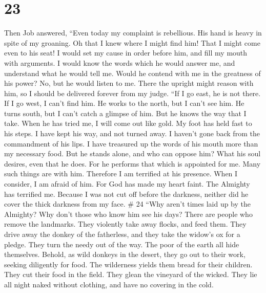 \hypertarget{section-14}{%
\section{23}\label{section-14}}

 Then Job answered,  ``Even today my complaint
is rebellious. His hand is heavy in spite of my groaning. 
Oh that I knew where I might find him! That I might come even to his
seat!  I would set my cause in order before him, and fill my
mouth with arguments.  I would know the words which he would
answer me, and understand what he would tell me.  Would he
contend with me in the greatness of his power? No, but he would listen
to me.  There the upright might reason with him, so I should
be delivered forever from my judge.  ``If I go east, he is
not there. If I go west, I can't find him.  He works to the
north, but I can't see him. He turns south, but I can't catch a glimpse
of him.  But he knows the way that I take. When he has
tried me, I will come out like gold.  My foot has held fast
to his steps. I have kept his way, and not turned away.  I
haven't gone back from the commandment of his lips. I have treasured up
the words of his mouth more than my necessary food.  But he
stands alone, and who can oppose him? What his soul desires, even that
he does.  For he performs that which is appointed for me.
Many such things are with him.  Therefore I am terrified at
his presence. When I consider, I am afraid of him.  For God
has made my heart faint. The Almighty has terrified me. 
Because I was not cut off before the darkness, neither did he cover the
thick darkness from my face. \# 24  ``Why aren't times laid
up by the Almighty? Why don't those who know him see his days?
 There are people who remove the landmarks. They violently
take away flocks, and feed them.  They drive away the donkey
of the fatherless, and they take the widow's ox for a pledge.
 They turn the needy out of the way. The poor of the earth
all hide themselves.  Behold, as wild donkeys in the desert,
they go out to their work, seeking diligently for food. The wilderness
yields them bread for their children.  They cut their food
in the field. They glean the vineyard of the wicked.  They
lie all night naked without clothing, and have no covering in the cold.
